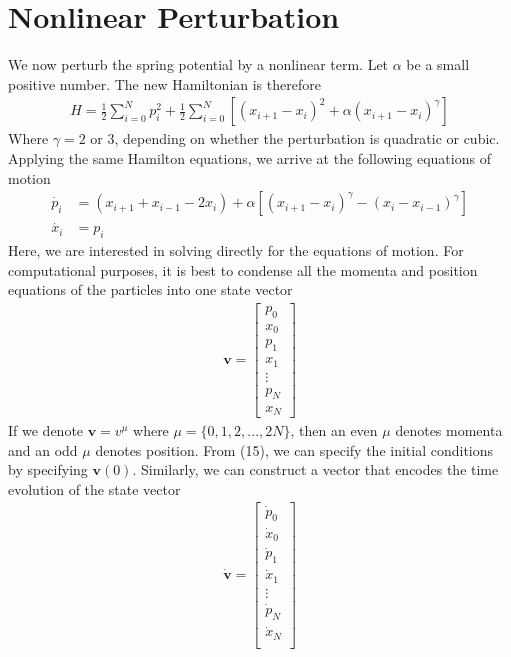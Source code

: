 \documentclass{article}
\newcommand{\ve}{\mathbf}
\begin{document}
\section{Nonlinear Perturbation}
We now perturb the spring potential by a nonlinear term. Let $\alpha$ be a small 
positive number. The new Hamiltonian is therefore 
\begin{align}
    H=\frac{1}{2}\sum_{i=0}^Np_i^2+\frac{1}{2}\sum_{i=0}^N[  (x_{i+1}-x_i)^2 + \alpha (x_{i+1}-x_i)^\gamma ]
\end{align}
Where $\gamma=2$ or 3, depending on whether the perturbation is quadratic or cubic. Applying the same Hamilton equations, we arrive at the following equations of motion 
\begin{align}
    \dot{p_i}&=(x_{i+1}+x_{i-1}-2x_i)+\alpha [(x_{i+1}-x_i)^\gamma-(x_i-x_{i-1})^\gamma]\\
    \dot{x_i}&=p_i
\end{align}
Here, we are interested in solving directly for the equations of motion. For computational purposes, 
it is best to condense all the momenta and position equations of the particles
into one state vector
\begin{align}
    \ve{v}=\begin{bmatrix}
        p_0\\ 
    x_0\\ 
    p_1\\ 
    x_1\\ 
    \vdots\\ 
    p_N\\ 
    x_N
    \end{bmatrix}
\end{align}
If we denote $\ve{v}=v^\mu$ where $\mu=\{ 0, 1, 2, ..., 2N\}$, 
then an even $\mu$ denotes momenta  and an odd $\mu$ denotes position.
From (15), we can specify the initial conditions by specifying $\ve{v}(0)$.
Similarly, we can construct a vector 
that encodes the time evolution of the state vector 
\begin{align}
    \dot{\ve{v}}=\begin{bmatrix}
    \dot{p}_0\\ 
    \dot{x}_0\\ 
    \dot{p}_1\\ 
    \dot{x}_1\\ 
    \vdots\\ 
    \dot{p}_N\\ 
    \dot{x}_N\\ 
    \end{bmatrix}
\end{align}
\end{document}
